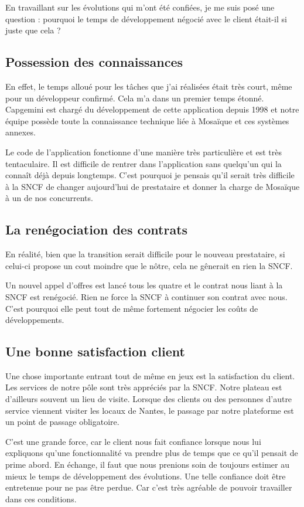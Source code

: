 En travaillant sur les évolutions qui m'ont été confiées, je me suis posé une question : pourquoi le temps de développement négocié avec le client était-il si juste que cela ? 

\subsection{Possession des connaissances}

En effet, le temps alloué pour les tâches que j'ai réalisées était très court, même pour un développeur confirmé. Cela m'a dans un premier temps étonné. Capgemini est chargé du développement de cette application depuis 1998 et notre équipe possède toute la connaissance technique liée à Mosaïque et ces systèmes annexes. 

Le code de l'application fonctionne d'une manière très particulière et est très tentaculaire. Il est difficile de rentrer dans l'application sans quelqu'un qui la connaît déjà depuis longtemps. C'est pourquoi je pensais qu'il serait très difficile à la SNCF de changer aujourd'hui de prestataire et donner la charge de Mosaïque à un de nos concurrents. 

\subsection{La renégociation des contrats}

    En réalité, bien que la transition serait difficile pour le nouveau prestataire, si celui-ci propose un cout moindre que le nôtre, cela ne gênerait en rien la SNCF.
    
    Un nouvel appel d'offres est lancé tous les quatre et le contrat nous liant à la SNCF est renégocié. Rien ne force la SNCF à continuer son contrat avec nous. C'est pourquoi elle peut tout de même fortement négocier les coûts de développements.
    
\subsection{Une bonne satisfaction client}

    Une chose importante entrant tout de même en jeux est la satisfaction du client. Les services de notre pôle sont très appréciés par la SNCF. Notre plateau est d'ailleurs souvent un lieu de visite. Lorsque des clients ou des personnes d'autre service viennent visiter les locaux de Nantes, le passage par notre plateforme est un point de passage obligatoire.
    
    C'est une grande force, car le client nous fait confiance lorsque nous lui expliquons qu'une fonctionnalité va prendre plus de temps que ce qu'il pensait de prime abord. En échange, il faut que nous prenions soin de toujours estimer au mieux le temps de développement des évolutions. Une telle confiance doit être entretenue pour ne pas être perdue. Car c'est très agréable de pouvoir travailler dans ces conditions.
